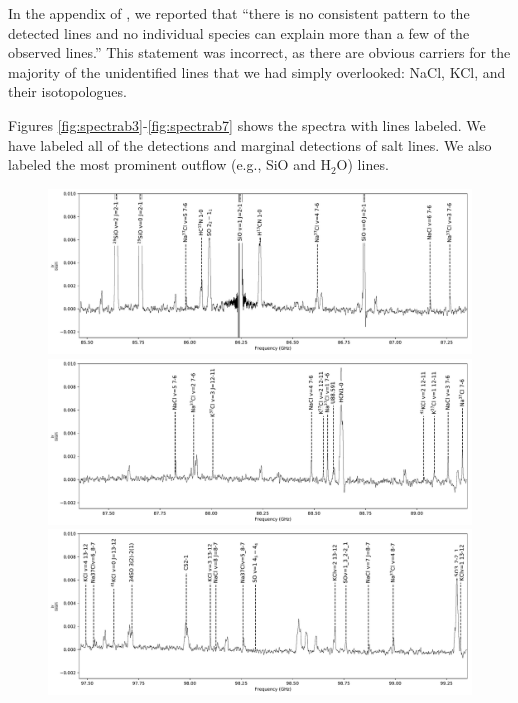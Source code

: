 \documentclass[twocolumn]{aastex62}
\begin{document}
In the appendix of \citet{Ginsburg2018b}, we reported that ``there is no
consistent pattern to the detected lines and no individual species can explain
more than a few of the observed lines.''  This statement was incorrect, as
there are obvious carriers for the majority of the unidentified lines that we
had simply overlooked: NaCl, KCl, and their isotopologues.

Figures \ref{fig:spectrab3}-\ref{fig:spectrab7} shows the spectra with lines labeled.  We have labeled all of the
detections and marginal detections of salt lines.  We also labeled the most
prominent outflow (e.g., SiO and H$_2$O) lines.

\begin{figure}[!htp]
\includegraphics[scale=1,width=5.5in]{figures/lines_labeled_OrionSourceI_B3_spw0_robust0.5.pdf}
\includegraphics[scale=1,width=5.5in]{figures/lines_labeled_OrionSourceI_B3_spw1_robust0.5.pdf}
\includegraphics[scale=1,width=5.5in]{figures/lines_labeled_OrionSourceI_B3_spw2_robust0.5.pdf}

\end{figure}
\end{document}
